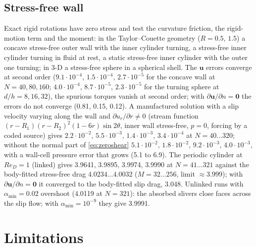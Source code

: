 \documentclass[11pt,a4paper]{article}
\theoremstyle{remark}
\newcommand{\uu}{\bm{u}}
\begin{document}
\subsection{Stress-free wall}
\label{sec:verif_zs}

Exact rigid rotations have zero stress and test the curvature friction, the rigid-motion term and
the moment: in the Taylor--Couette geometry ($R=0.5$, $1.5$) a concave stress-free outer wall with
the inner cylinder turning, a stress-free inner cylinder turning in fluid at rest, a static stress-free
inner cylinder with the outer one turning; in 3-D a stress-free sphere in a spherical shell. The
$\uu$ errors converge at second order ($9.1\cdot10^{-4}$, $1.5\cdot10^{-4}$, $2.7\cdot10^{-5}$ for the
concave wall at $N=40,80,160$; $4.0\cdot10^{-4}$, $8.7\cdot10^{-5}$, $2.3\cdot10^{-5}$ for the turning sphere
at $d/h=8,16,32$), the spurious torques vanish at second order; with $\partial\uu/\partial n=\bm 0$
the errors do not converge (0.81, 0.15, 0.12). A manufactured solution with a slip velocity varying along
the wall and $\partial u_r/\partial r\ne0$ (stream function $(r-R_1)(r-R_2)^2(1-6r)\sin2\theta$, inner
wall stress-free, $p=0$, forcing by a coded source) gives $2.2\cdot10^{-2}$, $5.5\cdot10^{-3}$,
$1.4\cdot10^{-3}$, $3.4\cdot10^{-4}$ at $N=40\dots320$; without the normal part of
\eqref{eq:zeroshear} $5.1\cdot10^{-2}$, $1.8\cdot10^{-2}$, $9.2\cdot10^{-3}$, $4.0\cdot10^{-3}$, with a
wall-cell pressure error that grows (5.1 to 6.9). The periodic cylinder at $Re_D=1$ (linked) gives
3.9641, 3.9895, 3.9974, 3.9990 at $N=41\dots321$ against the body-fitted stress-free drag
$4.0234\dots4.0032$ ($M=32\dots256$, limit $\approx3.999$); with $\partial\uu/\partial n=\bm 0$ it converged
to the body-fitted slip drag, 3.048. Unlinked runs with $\alpha_{\min}=0.02$ overshoot (4.0119 at $N=321$):
the absorbed slivers close faces across the slip flow; with $\alpha_{\min}=10^{-9}$ they give 3.9991.

\section{Limitations}
\label{sec:limits}
\end{document}
